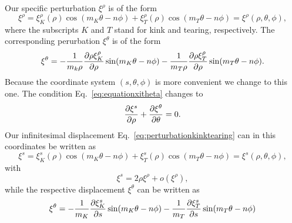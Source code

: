 Our specific perturbation $\xi^{\rho}$ is of the form
\begin{equation}
  \xi^{\rho} = \xi_K^{\rho} (\rho) \cos (m_K \theta - n \phi) + \xi_T^{\rho} (\rho) \cos (m_T \theta - n \phi) = \xi^{\rho} (\rho, \theta, \phi),
  \label{eq:perturbationkinktearing}
\end{equation}
where the subscripts $K$ and $T$ stand for kink and tearing,
respectively.
The corresponding perurbation $\xi^{\theta}$ is of the form
\begin{equation}
  \xi^{\theta} = - \frac{1}{m_k \rho} \frac{\partial \rho \xi_K^{\rho}}{\partial \rho} \sin (m_K \theta - n \phi)
                 - \frac{1}{m_T \rho} \frac{\partial \rho \xi_T^{\rho}}{\partial \rho} \sin (m_T \theta - n \phi).
\end{equation}
Because the coordinate system $(s, \theta, \phi)$ is more convenient we
change to this one.
The condition Eq.~\eqref{eq:equationxitheta} changes to
\begin{equation}
  \frac{\partial \xi^{s}}{\partial \rho} + \frac{\partial \xi^{\theta}}{\partial \theta} = 0.
\end{equation}
Our infinitesimal displacement Eq.~\eqref{eq:perturbationkinktearing}
can in this coordinates be written as
\begin{equation}
  \xi^{s} = \xi_K^{s} (\rho) \cos (m_K \theta - n \phi) + \xi_T^{s} (\rho) \cos (m_T \theta - n \phi) = \xi^{s} (\rho, \theta, \phi),
  \label{eq:infinitesimaldisplacements}
\end{equation}
with
\begin{equation}
  \xi^{s} = 2 \rho \xi^{\rho} + o(\xi^{\rho}),
\end{equation}
while the respective displacement $\xi^{\theta}$ can be written as
\begin{equation}
  \xi^{\theta} = - \frac{1}{m_K}\frac{\partial \xi_K^{s}}{\partial s} \sin (m_K \theta - n \phi) - \frac{1}{m_T}\frac{\partial \xi_T^{s}}{\partial s} \sin (m_T \theta - n \phi)
\end{equation}

